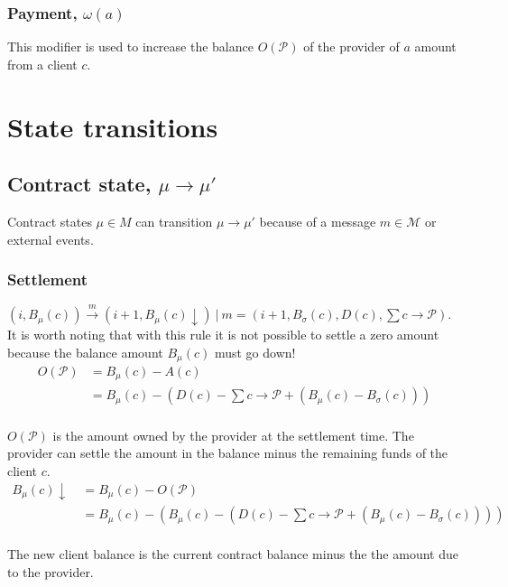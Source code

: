 \documentclass{llncs}
\begin{document}
\subsubsection{Payment, $\omega(a)$} This modifier is used to increase the balance $O(\mathcal{P})$ of the provider of $a$ amount from a client $c$.

\section{State transitions}

\subsection{Contract state, $\mu \rightarrow \mu'$} Contract states $\mu \in M$ can transition $\mu \rightarrow \mu'$ because of a message $m \in \mathcal{M}$ or external events.

\subsubsection{Settlement} $(i, B_\mu(c)) \xrightarrow{m} (i+1, B_\mu(c)\downarrow)\ |\ m = (i+1, B_\sigma(c), D(c), \sum c \rightarrow \mathcal{P})$. It is worth noting that with this rule it is not possible to settle a zero amount because the balance amount $B_\mu(c)$ must go down!
\begin{equation*}
\begin{split}
    O(\mathcal{P}) &= B_\mu(c) - A(c) \\
    &= B_\mu(c) - (D(c) - \textstyle \sum c \rightarrow \mathcal{P} + (B_\mu(c) - B_\sigma(c))) \\
\end{split}
\end{equation*}

$O(\mathcal{P})$ is the amount owned by the provider at the settlement time. The provider can settle the amount in the balance minus the remaining funds of the client $c$.
\begin{equation*}
\begin{split}
    B_\mu(c)\downarrow \ &= B_\mu(c) - O(\mathcal{P}) \\
    &= B_\mu(c) -(B_\mu(c) - (D(c) - \textstyle \sum c \rightarrow \mathcal{P} + (B_\mu(c) - B_\sigma(c)))) \\
\end{split}
\end{equation*}

The new client balance is the current contract balance minus the the amount due to the provider.
\end{document}
